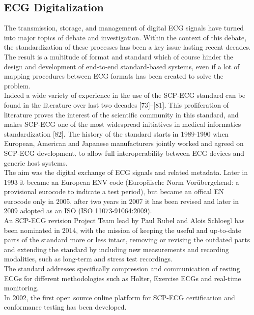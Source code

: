 \subsection{ECG Digitalization}
\label{subsection:ecgdigitaliation}
The transmission, storage, and management of digital ECG signals have turned into major topics of debate and investigation. Within the context of this debate, the standardization of these processes has been a key issue lasting recent decades. \cite{trigo} The result is a multitude of format and standard which of course hinder the design and development of end-to-end standard-based systems, even if a lot of mapping procedures between ECG formats has been created to solve the problem.\\
Indeed a wide variety of experience in the use of the SCP-ECG standard can be found in the literature over last two decades [73]–[81]. This proliferation of literature proves the interest of the scientific community in this standard, and makes SCP-ECG one of the most widespread initiatives in medical informatics standardization [82].
The history of the standard starts in 1989-1990 when European, American and Japanese manufacturers jointly worked and agreed on SCP-ECG development, to allow full interoperability between ECG devices and generic host systems.\\
The aim was the digital exchange of ECG signals and related metadata.
Later in 1993 it became an European ENV code (Europäische Norm Vorübergehend: a provisional eurocode to indicate a test period), but became an offical EN eurocode only in 2005, after two years in 2007 it has been revised and later in 2009 adopted as an ISO (ISO 11073-91064:2009).\\
An SCP-ECG revision Project Team lead by Paul Rubel and Alois Schloegl has been nominated in 2014, with the mission of keeping the useful and up-to-date parts of the standard more or less intact, removing or revising the outdated parts and extending the standard by including new measurements and recording modalities, such as long-term and stress test recordings.\cite{danilopani}\\
The standard addresses specifically compression and communication of resting ECGs for different methodologies such as Holter, Exercise ECGs and real-time monitoring.\\
In 2002, the first open source online platform for SCP-ECG certification and conformance testing has been developed.\cite{Chronaki}\\

